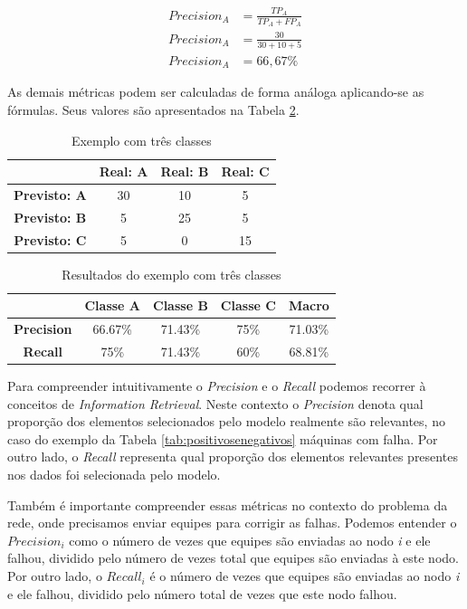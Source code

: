 \begin{align*}
Precision_A &= \frac{TP_A}{TP_A+FP_A} \\
Precision_A &= \frac{30}{30+10+5} \\
Precision_A &= 66,67\%
\end{align*}

As demais métricas podem ser calculadas de forma análoga aplicando-se as fórmulas.
Seus valores são apresentados na Tabela \ref{tab:resultados_exemplo2}.

\begin{table}[h!]
  \begin{center}
    \begin{tabular}{cccc}
      \hline
        & \textbf{Real: A} & \textbf{Real: B} & \textbf{Real: C}\\
      \hline

      \textbf{Previsto: A} & 30 & 10 & 5 \\
      \textbf{Previsto: B} & 5 & 25 & 5 \\
      \textbf{Previsto: C} & 5 & 0 & 15 \\

      \hline
    \end{tabular}
    \caption{Exemplo com três classes}
    \label{tab:positivosenegativos2}
  \end{center}
\end{table}

\begin{table}[h!]
  \begin{center}
    \begin{tabular}{ccccc}
      \hline
        & \textbf{Classe A} & \textbf{Classe B} & \textbf{Classe C} & \textbf{Macro}\\
      \hline

\textbf{Precision}	&	66.67\%	&	71.43\%	&	75\%	&	71.03\%	\\
\textbf{Recall}	&	75\%	&	71.43\%	&	60\%	&	68.81\%	\\

      \hline
    \end{tabular}
    \caption{Resultados do exemplo com três classes}
    \label{tab:resultados_exemplo2}
  \end{center}
\end{table}

Para compreender intuitivamente o \textit{Precision} e o \textit{Recall} podemos recorrer à conceitos de \textit{Information Retrieval}.
Neste contexto o \textit{Precision} denota qual proporção dos elementos selecionados pelo modelo realmente são relevantes, no caso do exemplo da Tabela \ref{tab:positivosenegativos} máquinas com falha.
Por outro lado, o \textit{Recall} representa qual proporção dos elementos relevantes presentes nos dados foi selecionada pelo modelo.

Também é importante compreender essas métricas no contexto do problema da rede, onde precisamos enviar equipes para corrigir as falhas.
Podemos entender o $Precision_i$ como o número de vezes que equipes são enviadas ao nodo \textit{i} e ele falhou, dividido pelo número de vezes total que equipes são enviadas à este nodo.
Por outro lado, o $Recall_i$ é o número de vezes que equipes são enviadas ao nodo \textit{i} e ele falhou, dividido pelo número total de vezes que este nodo falhou.